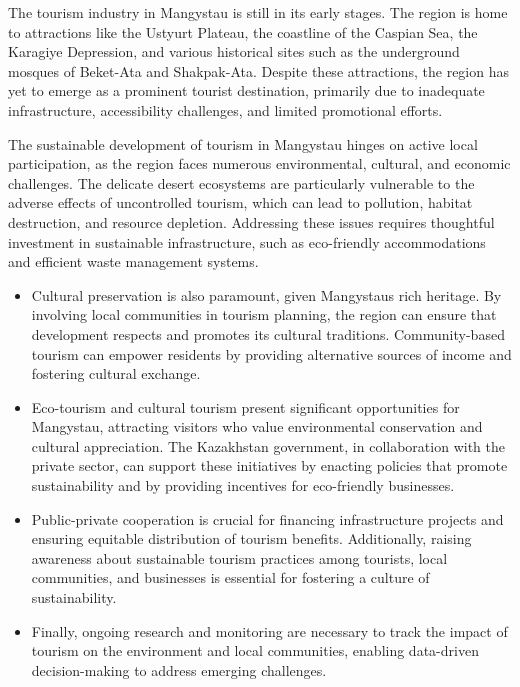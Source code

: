 The tourism industry in Mangystau is still in its early stages. The
region is home to attractions like the Ustyurt Plateau, the coastline of
the Caspian Sea, the Karagiye Depression, and various historical sites
such as the underground mosques of Beket-Ata and Shakpak-Ata. Despite
these attractions, the region has yet to emerge as a prominent tourist
destination, primarily due to inadequate infrastructure, accessibility
challenges, and limited promotional efforts.

The sustainable development of tourism in Mangystau hinges on active
local participation, as the region faces numerous environmental,
cultural, and economic challenges. The delicate desert ecosystems are
particularly vulnerable to the adverse effects of uncontrolled tourism,
which can lead to pollution, habitat destruction, and resource
depletion. Addressing these issues requires thoughtful investment in
sustainable infrastructure, such as eco-friendly accommodations and
efficient waste management systems.

\begin{itemize}
\item
  Cultural preservation is also paramount, given
  Mangystau\textquotesingle s rich heritage. By involving local
  communities in tourism planning, the region can ensure that
  development respects and promotes its cultural traditions.
  Community-based tourism can empower residents by providing alternative
  sources of income and fostering cultural exchange.
\item
  Eco-tourism and cultural tourism present significant opportunities for
  Mangystau, attracting visitors who value environmental conservation
  and cultural appreciation. The Kazakhstan government, in collaboration
  with the private sector, can support these initiatives by enacting
  policies that promote sustainability and by providing incentives for
  eco-friendly businesses.
\item
  Public-private cooperation is crucial for financing infrastructure
  projects and ensuring equitable distribution of tourism benefits.
  Additionally, raising awareness about sustainable tourism practices
  among tourists, local communities, and businesses is essential for
  fostering a culture of sustainability.
\item
  Finally, ongoing research and monitoring are necessary to track the
  impact of tourism on the environment and local communities, enabling
  data-driven decision-making to address emerging challenges.
\end{itemize}

